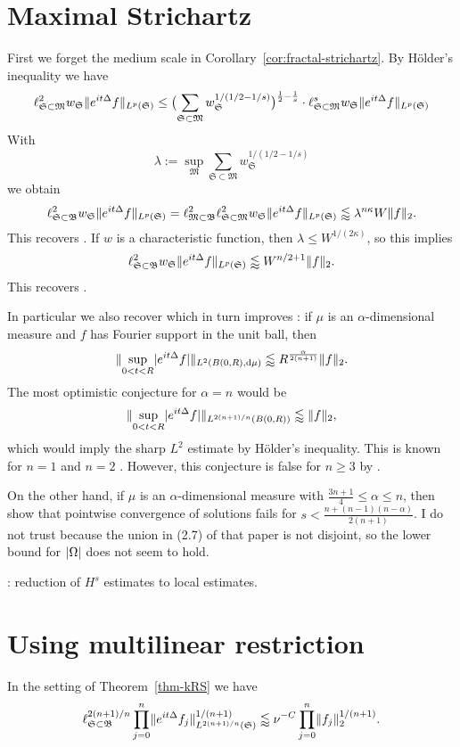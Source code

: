 \documentclass[biblatex]{pzorin-note}
\newcommand{\eit}{e^{i t \Delta}}
\newcommand{\bB}{\mathfrak{B}} %
\newcommand{\bM}{\mathfrak{M}} %
\newcommand{\bS}{\mathfrak{S}} %
\begin{document}
\section{Maximal Strichartz}
\label{sec:implications-of-fractal-strichartz}
First we forget the medium scale in Corollary~\ref{cor:fractal-strichartz}.
By H\"older's inequality we have
\[
\ell^{2}_{\bS \subset \bM} w_{\bS} \norm{\eit f}_{L^{p}(\bS)}
\leq
\bigl( \sum_{\bS \subset \bM} w_{\bS}^{1/(1/2-1/s)} \bigr)^{\frac{1}{2}-\frac{1}{s}} \cdot
\ell^{s}_{\bS \subset \bM} w_{\bS} \norm{\eit f}_{L^{p}(\bS)}
\]
With
\[
\lambda := \sup_{\bM} \sum_{\bS \subset \bM} w_{\bS}^{1/(1/2-1/s)}
\]
we obtain
\[
\ell^{2}_{\bS \subset \bB} w_{\bS} \norm{ \eit f }_{L^{p}(\bS)}
=
\ell^{2}_{\bM \subset \bB} \ell^{2}_{\bS \subset \bM} w_{\bS} \norm{ \eit f }_{L^{p}(\bS)}
\lessapprox
\lambda^{n \kappa} W \norm{f}_2.
\]
This recovers \cite[Theorem 1.5]{arxiv:1805.02775}.
If $w$ is a characteristic function, then $\lambda \leq W^{1/(2\kappa)}$, so this implies
\[
\ell^{2}_{\bS \subset \bB} w_{\bS} \norm{ \eit f }_{L^{p}(\bS)}
\lessapprox
W^{n/2+1} \norm{f}_2.
\]
This recovers \cite[Corollary 1.6]{arxiv:1805.02775}.

In particular we also recover \cite[Theorem 2.2]{arxiv:1805.02775} which in turn improves \cite[Theorem 1.7]{MR3842310}: if $\mu$ is an $\alpha$-dimensional measure and $f$ has Fourier support in the unit ball, then
\[
\norm{\sup_{0 < t < R} \abs{\eit f}}_{L^{2}(B(0,R),\dif\mu)}
\lessapprox
R^{\frac{\alpha}{2(n+1)}} \norm{f}_{2}.
\]
The most optimistic conjecture for $\alpha=n$ would be
\[
\norm{\sup_{0 < t < R} \abs{\eit f}}_{L^{2(n+1)/n}(B(0,R))}
\lessapprox
\norm{f}_{2},
\]
which would imply the sharp $L^{2}$ estimate by H\"older's inequality.
This is known for $n=1$ \cite{MR1101221} and $n=2$ \cite{MR3702674}.
However, this conjecture is false for $n \geq 3$ by \cite{arxiv:1902.01430}.

On the other hand, if $\mu$ is an $\alpha$-dimensional measure with $\frac{3n+1}{4} \leq \alpha \leq n$, then \cite{MR3574661} \cite{arxiv:1703.01360} show that pointwise convergence of solutions fails for $s < \frac{n + (n-1)(n-\alpha)}{2(n+1)}$.
I do not trust \cite{MR3574661} because the union in (2.7) of that paper is not disjoint, so the lower bound for $\lvert\Omega\rvert$ does not seem to hold.

\cite{MR2264734}: reduction of $H^{s}$ estimates to local estimates.

\section{Using multilinear restriction}
\begin{theorem} \label{thm:mult-restr}
In the setting of Theorem~\ref{thm-kRS} we have
\begin{equation} \label{kRS2}
\ell^{2(n+1)/n}_{\bS \subset \bB} \prod_{j=0}^{n} \norm{ \eit f_{j} }_{L^{2(n+1)/n}(\bS)}^{1/(n+1)}
\lessapprox \nu^{-C}
\prod_{j=0}^{n} \norm{f_{j}}_{2}^{1/(n+1)}.
\end{equation}
\end{theorem}
\end{document}
